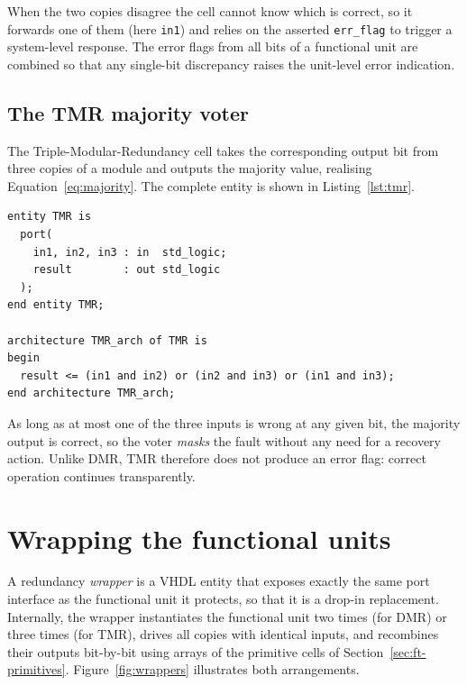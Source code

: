 When the two copies disagree the cell cannot know which is correct, so it
forwards one of them (here \texttt{in1}) and relies on the asserted
\texttt{err\_flag} to trigger a system-level response. The error flags from all
bits of a functional unit are combined so that any single-bit discrepancy raises
the unit-level error indication.

\subsection{The TMR majority voter}

The Triple-Modular-Redundancy cell takes the corresponding output bit from three
copies of a module and outputs the majority value, realising
Equation~\ref{eq:majority}. The complete entity is shown in
Listing~\ref{lst:tmr}.

\begin{lstlisting}[language=myvhdl, caption={The single-bit TMR majority voter.}, label={lst:tmr}]
entity TMR is
  port(
    in1, in2, in3 : in  std_logic;
    result        : out std_logic
  );
end entity TMR;

architecture TMR_arch of TMR is
begin
  result <= (in1 and in2) or (in2 and in3) or (in1 and in3);
end architecture TMR_arch;
\end{lstlisting}

As long as at most one of the three inputs is wrong at any given bit, the
majority output is correct, so the voter \emph{masks} the fault without any need
for a recovery action. Unlike DMR, TMR therefore does not produce an error flag:
correct operation continues transparently.

\section{Wrapping the functional units}
\label{sec:ft-wrappers}

A redundancy \emph{wrapper} is a VHDL entity that exposes exactly the same port
interface as the functional unit it protects, so that it is a drop-in
replacement. Internally, the wrapper instantiates the functional unit two times
(for DMR) or three times (for TMR), drives all copies with identical inputs, and
recombines their outputs bit-by-bit using arrays of the primitive cells of
Section~\ref{sec:ft-primitives}. Figure~\ref{fig:wrappers} illustrates both
arrangements.

